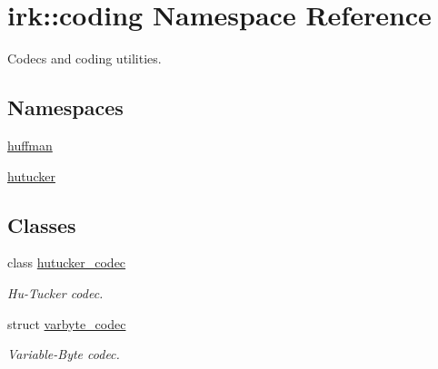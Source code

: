 \hypertarget{namespaceirk_1_1coding}{}\section{irk\+:\+:coding Namespace Reference}
\label{namespaceirk_1_1coding}


Codecs and coding utilities.  


\subsection*{Namespaces}
\begin{DoxyCompactItemize}
\item 
 \mbox{\hyperlink{namespaceirk_1_1coding_1_1huffman}{huffman}}
\item 
 \mbox{\hyperlink{namespaceirk_1_1coding_1_1hutucker}{hutucker}}
\end{DoxyCompactItemize}
\subsection*{Classes}
\begin{DoxyCompactItemize}
\item 
class \mbox{\hyperlink{classirk_1_1coding_1_1hutucker__codec}{hutucker\+\_\+codec}}
\begin{DoxyCompactList}\small\item\em Hu-\/\+Tucker codec. \end{DoxyCompactList}\item 
struct \mbox{\hyperlink{structirk_1_1coding_1_1varbyte__codec}{varbyte\+\_\+codec}}
\begin{DoxyCompactList}\small\item\em Variable-\/\+Byte codec. \end{DoxyCompactList}\end{DoxyCompactItemize}

